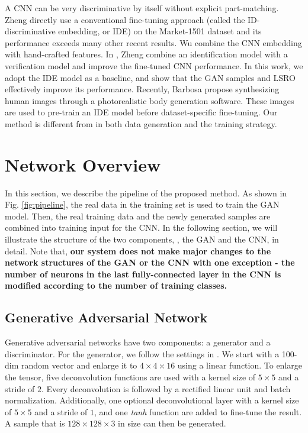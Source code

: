 \documentclass[10pt,twocolumn,letterpaper]{article}
\begin{document}
A CNN can be very discriminative by itself without explicit part-matching. Zheng \etal \cite{zheng2016survey,zheng2016person} directly use a conventional fine-tuning approach (called the ID-discriminative embedding, or IDE) on the Market-1501 dataset \cite{zheng2015scalable} and its performance exceeds many other recent results. Wu \etal \cite{wu2016enhanced} combine the CNN embedding with hand-crafted features. In \cite{zheng2016discriminatively}, Zheng \etal combine an identification model with a verification model and improve the fine-tuned CNN performance. In this work, we adopt the IDE model \cite{zheng2016survey,zheng2016person} as a baseline, and show that the GAN samples and LSRO effectively improve its performance. Recently, Barbosa \etal \cite{barbosa2017looking} propose synthesizing human images through a photorealistic body generation software. These images are used to pre-train an IDE model before dataset-specific fine-tuning. Our method is different from \cite{barbosa2017looking} in both data generation and the training strategy.


\section{Network Overview}
In this section, we describe the pipeline of the proposed method. As shown in Fig. \ref{fig:pipeline}, the real data in the training set is used to train the GAN model. Then, the real training data and the newly generated samples are combined into training input for the CNN. In the following section, we will illustrate the structure of the two components, \ie, the GAN and the CNN, in detail. Note that, \textbf{our system does not make major changes to the network structures of the GAN or the CNN with one exception - the number of neurons in the last fully-connected layer in the CNN is modified according to the number of training classes.}

\subsection{Generative Adversarial Network}
Generative adversarial networks have two components: a generator and a discriminator. For the generator, we follow the settings in \cite{radford2015unsupervised}. We start with a 100-dim random vector and enlarge it to $4\times4\times16$ using a linear function. To enlarge the tensor, five deconvolution functions are used with a kernel size of $5\times5$ and a stride of $2$. Every deconvolution is followed by a rectified linear unit and batch normalization. Additionally, one optional deconvolutional layer with a kernel size of $5\times5$ and a stride of $1$, and one \emph{tanh} function are added to fine-tune the result. A sample that is $128\times128\times3$ in size can then be generated. 
 
\end{document}
